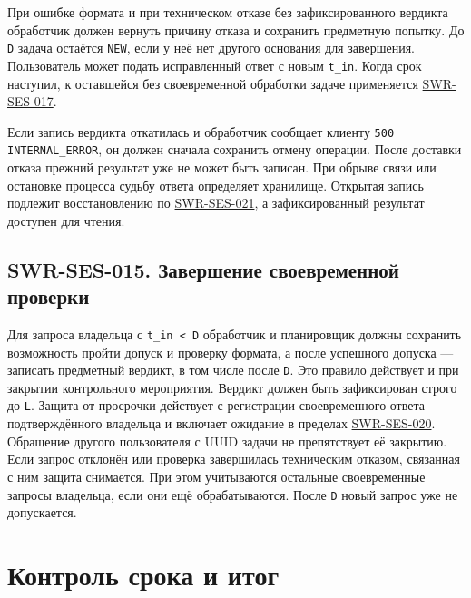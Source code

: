 \documentclass[12pt,a4paper]{article}
\begin{document}
\hypertarget{swr-ses-014-отказ-без-расхода-попытки}{}

\hypertarget{swr-ses-014}{}

При ошибке формата и при техническом отказе без зафиксированного вердикта обработчик должен вернуть причину отказа и сохранить предметную попытку. До \texttt{D} задача остаётся \texttt{NEW}, если у неё нет другого основания для завершения. Пользователь может подать исправленный ответ с новым \texttt{t\_in}. Когда срок наступил, к оставшейся без своевременной обработки задаче применяется {\hyperlink{swr-ses-017}{SWR-SES-017}}.

Если запись вердикта откатилась и обработчик сообщает клиенту \texttt{500 INTERNAL\_\allowbreak{}ERROR}, он должен сначала сохранить отмену операции. После доставки отказа прежний результат уже не может быть записан. При обрыве связи или остановке процесса судьбу ответа определяет хранилище. Открытая запись подлежит восстановлению по {\hyperlink{swr-ses-021}{SWR-SES-021}}, а зафиксированный результат доступен для чтения.

\subsection{SWR-SES-015. Завершение своевременной проверки}\label{swr-ses-015-ux437ux430ux432ux435ux440ux448ux435ux43dux438ux435-ux441ux432ux43eux435ux432ux440ux435ux43cux435ux43dux43dux43eux439-ux43fux440ux43eux432ux435ux440ux43aux438}

\hypertarget{swr-ses-015-завершение-своевременной-проверки}{}

\hypertarget{swr-ses-015}{}

Для запроса владельца с \texttt{t\_in\ \textless{}\ D} обработчик и планировщик должны сохранить возможность пройти допуск и проверку формата, а после успешного допуска --- записать предметный вердикт, в том числе после \texttt{D}. Это правило действует и при закрытии контрольного мероприятия. Вердикт должен быть зафиксирован строго до \texttt{L}. Защита от просрочки действует с регистрации своевременного ответа подтверждённого владельца и включает ожидание в пределах {\hyperlink{swr-ses-020}{SWR-SES-020}}. Обращение другого пользователя с UUID задачи не препятствует её закрытию. Если запрос отклонён или проверка завершилась техническим отказом, связанная с ним защита снимается. При этом учитываются остальные своевременные запросы владельца, если они ещё обрабатываются. После \texttt{D} новый запрос уже не допускается.

\section{Контроль срока и итог}\label{4-ux43aux43eux43dux442ux440ux43eux43bux44c-ux441ux440ux43eux43aux430-ux438-ux438ux442ux43eux433}
\end{document}
